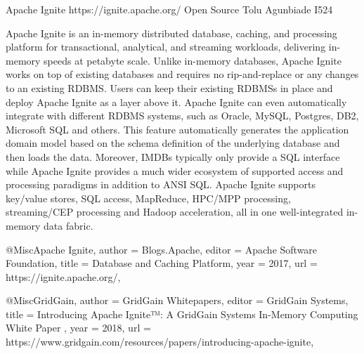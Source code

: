 Apache Ignite
https://ignite.apache.org/
Open Source
Tolu Agunbiade
I524


Apache Ignite is an in-memory distributed database, caching, and processing platform for
transactional, analytical, and streaming workloads, delivering in-memory speeds at petabyte scale\cite{Apache Ignite}.
Unlike in-memory databases, Apache Ignite works on top of existing databases and requires no rip-and-replace or any changes to an existing RDBMS. Users can keep their existing RDBMSs in place and deploy Apache Ignite as a layer above it. Apache Ignite can even automatically integrate with different RDBMS systems, such as Oracle, MySQL, Postgres, DB2, Microsoft SQL and others. This feature automatically generates the application domain model based on the schema definition of the underlying database and then loads the data. Moreover, IMDBs typically only provide a SQL interface while Apache Ignite provides a much wider ecosystem of supported access and processing paradigms in addition to ANSI SQL. Apache Ignite supports key/value stores, SQL access, MapReduce, HPC/MPP processing, streaming/CEP processing and Hadoop acceleration, all in one well-integrated in-memory data fabric\cite{GridGain}.


@Misc{Apache Ignite,
 author = {Blogs.Apache},
 editor = {Apache Software Foundation},
 title  = {Database and Caching Platform},
 year   = {2017},
 url    = {https://ignite.apache.org/},
}


@Misc{GridGain,
 author = {GridGain Whitepapers},
 editor = {GridGain Systems},
 title  = {Introducing Apache Ignite™: A GridGain Systems In-Memory Computing White Paper },
 year   = {2018},
 url    = {https://www.gridgain.com/resources/papers/introducing-apache-ignite},
}
